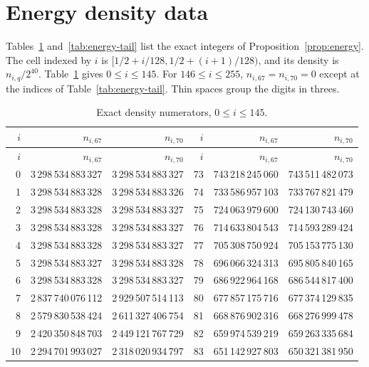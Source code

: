 \appendix
\section{Energy density data}\label{app:cert}
Tables~\ref{tab:energy-density} and~\ref{tab:energy-tail} list the exact integers of Proposition~\ref{prop:energy}.
The cell indexed by $i$ is $[1/2+i/128,1/2+(i+1)/128)$, and its density is $n_{i,q}/2^{40}$.
Table~\ref{tab:energy-density} gives $0\le i\le145$. For $146\le i\le255$, $n_{i,67}=n_{i,70}=0$ except at the indices of Table~\ref{tab:energy-tail}.
Thin spaces group the digits in threes.
\small
\renewcommand{\arraystretch}{1.12}
\begin{longtable}{@{}r r r@{\qquad}r r r@{}}
\caption{Exact density numerators, $0\le i\le145$.}\label{tab:energy-density}\\
\toprule
$i$ & $n_{i,67}$ & $n_{i,70}$ & $i$ & $n_{i,67}$ & $n_{i,70}$\\
\midrule
\endfirsthead
\toprule
$i$ & $n_{i,67}$ & $n_{i,70}$ & $i$ & $n_{i,67}$ & $n_{i,70}$\\
\midrule
\endhead
0 & 3\,298\,534\,883\,327 & 3\,298\,534\,883\,327 & 73 & 743\,218\,245\,060 & 743\,511\,482\,073\\
1 & 3\,298\,534\,883\,328 & 3\,298\,534\,883\,326 & 74 & 733\,586\,957\,103 & 733\,767\,821\,479\\
2 & 3\,298\,534\,883\,328 & 3\,298\,534\,883\,327 & 75 & 724\,063\,979\,600 & 724\,130\,743\,460\\
3 & 3\,298\,534\,883\,328 & 3\,298\,534\,883\,327 & 76 & 714\,633\,804\,543 & 714\,593\,289\,424\\
4 & 3\,298\,534\,883\,328 & 3\,298\,534\,883\,327 & 77 & 705\,308\,750\,924 & 705\,153\,775\,130\\
5 & 3\,298\,534\,883\,327 & 3\,298\,534\,883\,328 & 78 & 696\,066\,324\,313 & 695\,805\,840\,165\\
6 & 3\,298\,534\,883\,328 & 3\,298\,534\,883\,327 & 79 & 686\,922\,964\,168 & 686\,544\,817\,400\\
7 & 2\,837\,740\,076\,112 & 2\,929\,507\,514\,113 & 80 & 677\,857\,175\,716 & 677\,374\,129\,835\\
8 & 2\,579\,830\,538\,424 & 2\,611\,327\,406\,754 & 81 & 668\,876\,902\,316 & 668\,276\,999\,478\\
9 & 2\,420\,350\,848\,703 & 2\,449\,121\,767\,729 & 82 & 659\,974\,539\,219 & 659\,263\,335\,684\\
10 & 2\,294\,701\,993\,027 & 2\,318\,020\,934\,797 & 83 & 651\,142\,927\,803 & 650\,321\,381\,950\\

\end{longtable}

